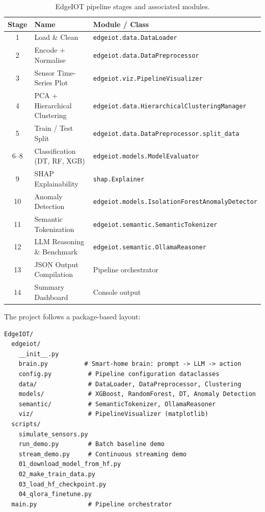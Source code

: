 \documentclass[12pt,a4paper,oneside]{report}
\begin{document}
\begin{table}[htbp]
\caption{EdgeIOT pipeline stages and associated modules.}
\label{tab:pipeline-stages}
\centering
\small
\begin{tabularx}{\textwidth}{clX}
\toprule
\textbf{Stage} & \textbf{Name} & \textbf{Module / Class} \\
\midrule
1  & Load \& Clean              & \texttt{edgeiot.data.DataLoader} \\
2  & Encode + Normalise         & \texttt{edgeiot.data.DataPreprocessor} \\
3  & Sensor Time-Series Plot    & \texttt{edgeiot.viz.PipelineVisualizer} \\
4  & PCA + Hierarchical Clustering & \texttt{edgeiot.data.HierarchicalClusteringManager} \\
5  & Train / Test Split         & \texttt{edgeiot.data.DataPreprocessor.split\_data} \\
6--8 & Classification (DT, RF, XGB) & \texttt{edgeiot.models.ModelEvaluator} \\
9  & SHAP Explainability        & \texttt{shap.Explainer} \\
10 & Anomaly Detection          & \texttt{edgeiot.models.IsolationForestAnomalyDetector} \\
11 & Semantic Tokenization      & \texttt{edgeiot.semantic.SemanticTokenizer} \\
12 & LLM Reasoning \& Benchmark & \texttt{edgeiot.semantic.OllamaReasoner} \\
13 & JSON Output Compilation    & Pipeline orchestrator \\
14 & Summary Dashboard          & Console output \\
\bottomrule
\end{tabularx}
\end{table}

The project follows a package-based layout:

\begin{lstlisting}[language={},caption={EdgeIOT project structure.},label={lst:project-structure}]
EdgeIOT/
  edgeiot/
    __init__.py
    brain.py          # Smart-home brain: prompt -> LLM -> action
    config.py          # Pipeline configuration dataclasses
    data/              # DataLoader, DataPreprocessor, Clustering
    models/            # XGBoost, RandomForest, DT, Anomaly Detection
    semantic/          # SemanticTokenizer, OllamaReasoner
    viz/               # PipelineVisualizer (matplotlib)
  scripts/
    simulate_sensors.py
    run_demo.py        # Batch baseline demo
    stream_demo.py     # Continuous streaming demo
    01_download_model_from_hf.py
    02_make_train_data.py
    03_load_hf_checkpoint.py
    04_qlora_finetune.py
  main.py              # Pipeline orchestrator
\end{lstlisting}
\end{document}
